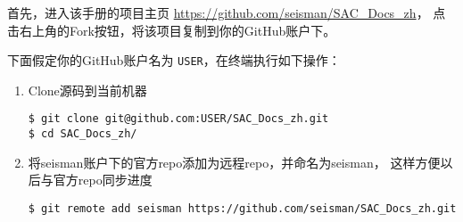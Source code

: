 首先，进入该手册的项目主页 \url{https://github.com/seisman/SAC_Docs_zh}，
点击右上角的Fork按钮，将该项目复制到你的GitHub账户下。

下面假定你的GitHub账户名为 \texttt{USER}，在终端执行如下操作：
\begin{enumerate}
\item Clone源码到当前机器
\begin{verbatim}
$ git clone git@github.com:USER/SAC_Docs_zh.git
$ cd SAC_Docs_zh/
\end{verbatim}
\item 将seisman账户下的官方repo添加为远程repo，并命名为seisman，
    这样方便以后与官方repo同步进度
\begin{verbatim}
$ git remote add seisman https://github.com/seisman/SAC_Docs_zh.git
\end{verbatim}
\end{enumerate}

